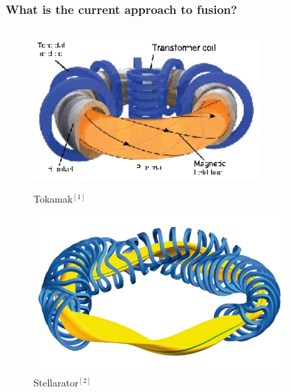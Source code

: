 \documentclass{beamer}
\begin{document}
\begin{frame}
\frametitle{What is the current approach to fusion?}
\vspace{-1.8 cm}
\begin{columns}[onlytextwidth]
	\begin{column}{0.45\textwidth}
		\begin{center}
		\begin{figure}
			\includegraphics[trim={0 0 0 0cm},clip,width=0.8\textwidth]{FIGURES/Schematic-of-a-Tokamak-fusion-reactor-Source-Fusion-for-energy.eps}
	\vspace{-0.2cm}	\caption{Tokamak$^{[1]}$}
					\includegraphics[trim={0 0 0 0cm},clip,width=0.9\textwidth]{FIGURES/W7X-Spulen_Plasma_blau_gelb.jpg}
	\vspace{-0.4cm}	\caption{Stellarator$^{[2]}$}
		\end{figure}
		\end{center}
	\end{column}
	\begin{column}{0.55\textwidth}
		\vspace{1cm}
		\begin{center}
			\begin{itemize}

\end{itemize}
\end{center}
\end{column}
\end{columns}
\end{frame}
\end{document}
